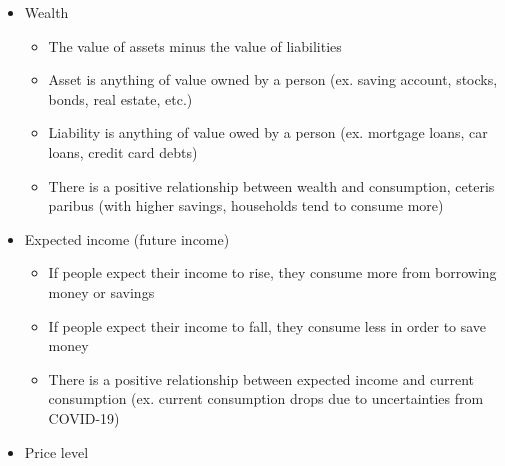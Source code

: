 \documentclass[12pt]{article}
\begin{document}
\begin{enumerate}
\begin{enumerate}
\begin{enumerate}
\begin{enumerate}
\begin{itemize}
\begin{itemize}
                        \end{itemize}

                      \item Wealth

                        \begin{itemize}

                          \item The value of assets minus the value of liabilities

                          \item Asset is anything of value owned by a person (ex. saving account, stocks, bonds, real estate, etc.)

                          \item Liability is anything of value owed by a person (ex. mortgage loans, car loans, credit card debts)

                          \item There is a positive relationship between wealth and consumption, ceteris paribus (with higher savings, households tend to consume more)

                        \end{itemize}
                        
                      \item Expected income (future income)

                        \begin{itemize}

                          \item If people expect their income to rise, they consume more from borrowing money or savings

                          \item If people expect their income to fall, they consume less in order to save money

                          \item There is a positive relationship between expected income and current consumption (ex. current consumption drops due to uncertainties from COVID-19)

                        \end{itemize}

                      \item Price level

                        \begin{itemize}


\end{itemize}
\end{itemize}
\end{enumerate}
\end{enumerate}
\end{enumerate}
\end{enumerate}
\end{document}

